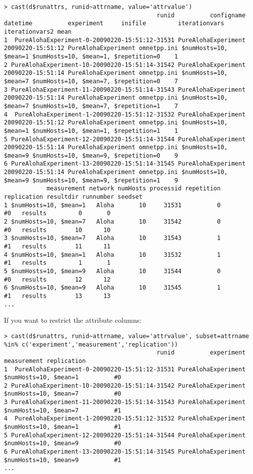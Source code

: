 \begin{verbatim}
> cast(d$runattrs, runid~attrname, value='attrvalue')
                                           runid          configname          datetime          experiment     inifile         iterationvars                       iterationvars2 mean
1  PureAlohaExperiment-0-20090220-15:51:12-31531 PureAlohaExperiment 20090220-15:51:12 PureAlohaExperiment omnetpp.ini $numHosts=10, $mean=1 $numHosts=10, $mean=1, $repetition=0    1
2 PureAlohaExperiment-10-20090220-15:51:14-31542 PureAlohaExperiment 20090220-15:51:14 PureAlohaExperiment omnetpp.ini $numHosts=10, $mean=7 $numHosts=10, $mean=7, $repetition=0    7
3 PureAlohaExperiment-11-20090220-15:51:14-31543 PureAlohaExperiment 20090220-15:51:14 PureAlohaExperiment omnetpp.ini $numHosts=10, $mean=7 $numHosts=10, $mean=7, $repetition=1    7
4  PureAlohaExperiment-1-20090220-15:51:12-31532 PureAlohaExperiment 20090220-15:51:12 PureAlohaExperiment omnetpp.ini $numHosts=10, $mean=1 $numHosts=10, $mean=1, $repetition=1    1
5 PureAlohaExperiment-12-20090220-15:51:14-31544 PureAlohaExperiment 20090220-15:51:14 PureAlohaExperiment omnetpp.ini $numHosts=10, $mean=9 $numHosts=10, $mean=9, $repetition=0    9
6 PureAlohaExperiment-13-20090220-15:51:14-31545 PureAlohaExperiment 20090220-15:51:14 PureAlohaExperiment omnetpp.ini $numHosts=10, $mean=9 $numHosts=10, $mean=9, $repetition=1    9
            measurement network numHosts processid repetition replication resultdir runnumber seedset
1 $numHosts=10, $mean=1   Aloha       10     31531          0          #0   results         0       0
2 $numHosts=10, $mean=7   Aloha       10     31542          0          #0   results        10      10
3 $numHosts=10, $mean=7   Aloha       10     31543          1          #1   results        11      11
4 $numHosts=10, $mean=1   Aloha       10     31532          1          #1   results         1       1
5 $numHosts=10, $mean=9   Aloha       10     31544          0          #0   results        12      12
6 $numHosts=10, $mean=9   Aloha       10     31545          1          #1   results        13      13
...
\end{verbatim}

If you want to restrict the attribute columns:

\begin{verbatim}
> cast(d$runattrs, runid~attrname, value='attrvalue', subset=attrname %in% c('experiment','measurement','replication'))
                                           runid          experiment           measurement replication
1  PureAlohaExperiment-0-20090220-15:51:12-31531 PureAlohaExperiment $numHosts=10, $mean=1          #0
2 PureAlohaExperiment-10-20090220-15:51:14-31542 PureAlohaExperiment $numHosts=10, $mean=7          #0
3 PureAlohaExperiment-11-20090220-15:51:14-31543 PureAlohaExperiment $numHosts=10, $mean=7          #1
4  PureAlohaExperiment-1-20090220-15:51:12-31532 PureAlohaExperiment $numHosts=10, $mean=1          #1
5 PureAlohaExperiment-12-20090220-15:51:14-31544 PureAlohaExperiment $numHosts=10, $mean=9          #0
6 PureAlohaExperiment-13-20090220-15:51:14-31545 PureAlohaExperiment $numHosts=10, $mean=9          #1
...
\end{verbatim}

